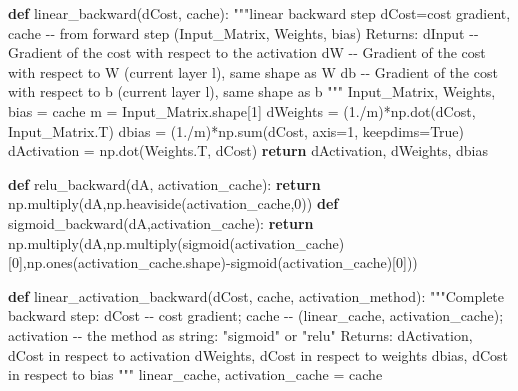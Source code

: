 \documentclass[
  letterpaper,
  DIV=11,
  numbers=noendperiod]{scrartcl}
\newenvironment{Shaded}{\begin{snugshade}}{\end{snugshade}}
\newcommand{\BuiltInTok}[1]{\textcolor[rgb]{0.00,0.23,0.31}{#1}}
\newcommand{\CommentTok}[1]{\textcolor[rgb]{0.37,0.37,0.37}{#1}}
\newcommand{\ControlFlowTok}[1]{\textcolor[rgb]{0.00,0.23,0.31}{\textbf{#1}}}
\newcommand{\DecValTok}[1]{\textcolor[rgb]{0.68,0.00,0.00}{#1}}
\newcommand{\FloatTok}[1]{\textcolor[rgb]{0.68,0.00,0.00}{#1}}
\newcommand{\KeywordTok}[1]{\textcolor[rgb]{0.00,0.23,0.31}{\textbf{#1}}}
\newcommand{\NormalTok}[1]{\textcolor[rgb]{0.00,0.23,0.31}{#1}}
\newcommand{\OperatorTok}[1]{\textcolor[rgb]{0.37,0.37,0.37}{#1}}
\newcommand{\VariableTok}[1]{\textcolor[rgb]{0.07,0.07,0.07}{#1}}
\begin{document}
\begin{Shaded}
\begin{Highlighting}[]
\KeywordTok{def}\NormalTok{ linear\_backward(dCost, cache):}
    \CommentTok{"""linear backward step}
\CommentTok{    dCost=cost gradient, cache {-}{-} from forward step (Input\_Matrix, Weights, bias) }
\CommentTok{    }
\CommentTok{    Returns:}
\CommentTok{    dInput {-}{-} Gradient of the cost with respect to the activation}
\CommentTok{    dW {-}{-} Gradient of the cost with respect to W (current layer l), same shape as W}
\CommentTok{    db {-}{-} Gradient of the cost with respect to b (current layer l), same shape as b}
\CommentTok{    """}
\NormalTok{    Input\_Matrix, Weights, bias }\OperatorTok{=}\NormalTok{ cache}
\NormalTok{    m }\OperatorTok{=}\NormalTok{ Input\_Matrix.shape[}\DecValTok{1}\NormalTok{]}
\NormalTok{    dWeights }\OperatorTok{=}\NormalTok{ (}\FloatTok{1.}\OperatorTok{/}\NormalTok{m)}\OperatorTok{*}\NormalTok{np.dot(dCost, Input\_Matrix.T)}
\NormalTok{    dbias }\OperatorTok{=}\NormalTok{ (}\FloatTok{1.}\OperatorTok{/}\NormalTok{m)}\OperatorTok{*}\NormalTok{np.}\BuiltInTok{sum}\NormalTok{(dCost, axis}\OperatorTok{=}\DecValTok{1}\NormalTok{, keepdims}\OperatorTok{=}\VariableTok{True}\NormalTok{)}
\NormalTok{    dActivation }\OperatorTok{=}\NormalTok{ np.dot(Weights.T, dCost)}
    \ControlFlowTok{return}\NormalTok{ dActivation, dWeights, dbias}

\KeywordTok{def}\NormalTok{ relu\_backward(dA, activation\_cache):}
    \ControlFlowTok{return}\NormalTok{ np.multiply(dA,np.heaviside(activation\_cache,}\DecValTok{0}\NormalTok{))}
\KeywordTok{def}\NormalTok{ sigmoid\_backward(dA,activation\_cache):}
    \ControlFlowTok{return}\NormalTok{ np.multiply(dA,np.multiply(sigmoid(activation\_cache)[}\DecValTok{0}\NormalTok{],np.ones(activation\_cache.shape)}\OperatorTok{{-}}\NormalTok{sigmoid(activation\_cache)[}\DecValTok{0}\NormalTok{]))}

\KeywordTok{def}\NormalTok{ linear\_activation\_backward(dCost, cache, activation\_method):}
    \CommentTok{"""Complete backward step:}
\CommentTok{    dCost {-}{-} cost gradient; }
\CommentTok{    cache {-}{-} (linear\_cache, activation\_cache); }
\CommentTok{    activation {-}{-} the method as string: "sigmoid" or "relu"}
\CommentTok{    }
\CommentTok{    Returns:}
\CommentTok{    dActivation, dCost in respect to activation}
\CommentTok{    dWeights, dCost in respect to weights}
\CommentTok{    dbias, dCost in respect to bias}
\CommentTok{    """}
\NormalTok{    linear\_cache, activation\_cache }\OperatorTok{=}\NormalTok{ cache}
    

\end{Highlighting}
\end{Shaded}
\end{document}
